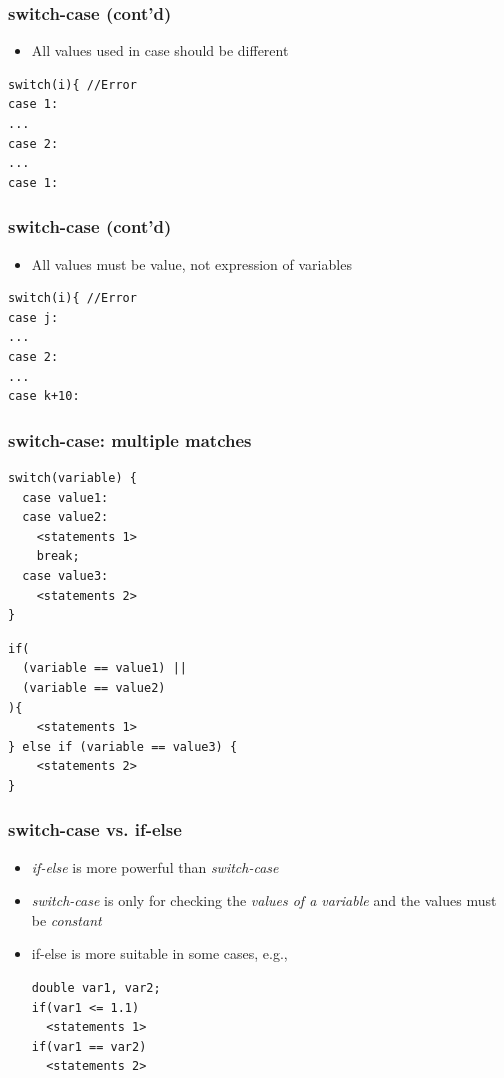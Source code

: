 \documentclass{../c-lecture}
\begin{document}
\begin{frame}[fragile]
  \frametitle{switch-case (cont’d)}
  \begin{itemize}
    \item All values used in case should be different
  \end{itemize}
  \begin{verbatim}
switch(i){ //Error
case 1:
...
case 2:
...
case 1:
  \end{verbatim}
\end{frame}

\begin{frame}[fragile]
  \frametitle{switch-case (cont’d)}
  \begin{itemize}
    \item All values must be value, not expression of variables
  \end{itemize}
  \begin{verbatim}
switch(i){ //Error
case j:
...
case 2:
...
case k+10:
  \end{verbatim}
\end{frame}

\begin{frame}[fragile]
  \frametitle{switch-case: multiple matches}
  \scriptsize
  \begin{verbatim}
switch(variable) {
  case value1:
  case value2:
    <statements 1>
    break;
  case value3:
    <statements 2>
}
  \end{verbatim}
  \scriptsize
  \begin{verbatim}
if(
  (variable == value1) ||
  (variable == value2)
){
    <statements 1>
} else if (variable == value3) {
    <statements 2>
}
  \end{verbatim}
\end{frame}

\begin{frame}[fragile]
  \frametitle{switch-case vs. if-else}
  \begin{itemize}
    \item
      \textit{\color{Orange} if-else} is more powerful than
      \textit{\color{Orange} switch-case}

    \item
      \textit{\color{LimeGreen} switch-case} is only for checking the
      \textit{\color{LimeGreen} values of a variable} and the values must be
      \textit{\color{LimeGreen} constant}

    \item if-else is more suitable in some cases, e.g.,
    \begin{verbatim}
double var1, var2;
if(var1 <= 1.1)
  <statements 1>
if(var1 == var2)
  <statements 2>
    \end{verbatim}
  \end{itemize}
\end{frame}
\end{document}
